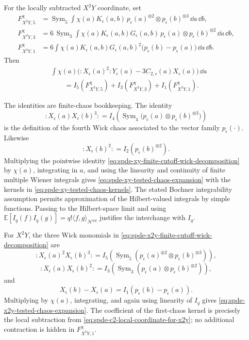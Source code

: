 For the locally subtracted \(X^2Y\) coordinate, set
\begin{equation}
\begin{aligned}
  F_{X^2Y,5}^{\chi}
  &=
  \operatorname{Sym}_5
  \int\chi(a)K_\epsilon(a,b)\,
  p_\epsilon(a)^{\otimes2}\otimes p_\epsilon(b)^{\otimes3}
  \,\dd a\,\dd b,\\
  F_{X^2Y,3}^{\chi}
  &=
  6\,\operatorname{Sym}_3
  \int\chi(a)K_\epsilon(a,b)G_\epsilon(a,b)\,
  p_\epsilon(a)\otimes p_\epsilon(b)^{\otimes2}\,\dd a\,\dd b,\\
  F_{X^2Y,1}^{\chi}
  &=
  6\int\chi(a)K_\epsilon(a,b)G_\epsilon(a,b)^2
  \bigl(p_\epsilon(b)-p_\epsilon(a)\bigr)\,\dd a\,\dd b .
\end{aligned}
  \label{eq:spde-x2y-tested-chaos-kernels}
\end{equation}
Then
\begin{equation}
\begin{aligned}
  &\int\chi(a)
  \bigl(:\!X_\epsilon(a)^2\!:Y_\epsilon(a)
        -3C_{2,\epsilon}(a)X_\epsilon(a)\bigr)\,\dd a\\
  &\qquad =
  I_5(F_{X^2Y,5}^{\chi})
  +I_3(F_{X^2Y,3}^{\chi})
  +I_1(F_{X^2Y,1}^{\chi}) .
\end{aligned}
  \label{eq:spde-x2y-tested-chaos-expansion}
\end{equation}

The identities are finite-chaos bookkeeping.
The identity
\[
  :X_\epsilon(a)X_\epsilon(b)^3:
  =
  I_4\!\left(
    \operatorname{Sym}_4
    \bigl(p_\epsilon(a)\otimes p_\epsilon(b)^{\otimes3}\bigr)
  \right)
\]
is the definition of the fourth Wick chaos associated to the vector family
\(p_\epsilon(\cdot)\).  Likewise
\[
  :X_\epsilon(b)^2:
  =
  I_2(p_\epsilon(b)^{\otimes2}).
\]
Multiplying the pointwise identity
\eqref{eq:spde-xy-finite-cutoff-wick-decomposition} by \(\chi(a)\),
integrating in \(a\), and using the linearity and continuity of finite
multiple Wiener integrals gives
\eqref{eq:spde-xy-tested-chaos-expansion} with the kernels in
\eqref{eq:spde-xy-tested-chaos-kernels}.  The stated Bochner integrability
assumption permits approximation of the Hilbert-valued integrals by simple
functions.  Passing to the Hilbert-space limit and using
\(\mathbb E[I_q(f)I_q(g)]=q!\langle f,g\rangle_{\mathcal H^{\otimes q}}\)
justifies the interchange with \(I_q\).

For \(X^2Y\), the three Wick monomials in
\eqref{eq:spde-x2y-finite-cutoff-wick-decomposition} are
\[
  :X_\epsilon(a)^2X_\epsilon(b)^3:
  =
  I_5\!\left(
    \operatorname{Sym}_5
    (p_\epsilon(a)^{\otimes2}\otimes p_\epsilon(b)^{\otimes3})
  \right),
\]
\[
  :X_\epsilon(a)X_\epsilon(b)^2:
  =
  I_3\!\left(
    \operatorname{Sym}_3
    (p_\epsilon(a)\otimes p_\epsilon(b)^{\otimes2})
  \right),
\]
and
\[
  X_\epsilon(b)-X_\epsilon(a)
  =
  I_1(p_\epsilon(b)-p_\epsilon(a)).
\]
Multiplying by \(\chi(a)\), integrating, and again using linearity of
\(I_q\) gives
\eqref{eq:spde-x2y-tested-chaos-expansion}.  The coefficient of the
first-chaos kernel is precisely the local subtraction from
\eqref{eq:spde-c2-local-coordinate-for-x2y}; no additional contraction is
hidden in \(F_{X^2Y,1}^{\chi}\).

